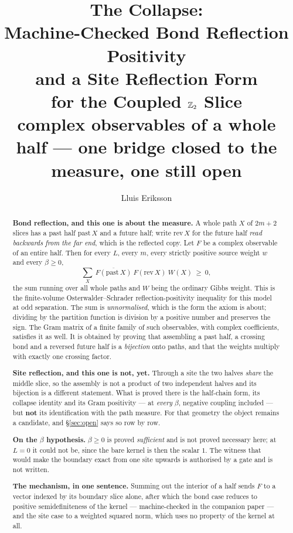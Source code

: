 \documentclass[11pt]{article}
\title{The Collapse:\\
Machine-Checked Bond Reflection Positivity\\
and a Site Reflection Form\\
for the Coupled $\mathbb{Z}_2$ Slice\\
\large complex observables of a whole half --- one bridge closed to the
measure, one still open}
\author{Lluis Eriksson}
\date{}
\theoremstyle{definition}
\begin{document}
\maketitle

\begin{abstract}
\textbf{Bond reflection, and this one is about the measure.}  A whole path $X$
of $2m+2$ slices has a past half $\mathrm{past}\,X$ and a future half; write
$\mathrm{rev}\,X$ for the future half \emph{read backwards from the far end},
which is the reflected copy.  Let $F$ be a complex observable of an entire half.
Then for every $L$, every $m$, every strictly positive source weight $w$ and
every $\beta\ge0$,
\[
  \sum_{X}\ \overline{F(\mathrm{past}\,X)}\ F(\mathrm{rev}\,X)\ W(X)\ \ge\ 0 ,
\]
the sum running over all whole paths and $W$ being the ordinary Gibbs weight.
This is the finite-volume Osterwalder--Schrader reflection-positivity inequality
for this model at odd separation.  The sum is \emph{unnormalised}, which is the
form the axiom is about; dividing by the partition function is division by a
positive number and preserves the sign.  The Gram matrix of a finite family of
such observables, with complex coefficients, satisfies it as well.  It is obtained by proving that
assembling a past half, a crossing bond and a reversed future half is a
\emph{bijection} onto paths, and that the weights multiply with exactly one
crossing factor.

\textbf{Site reflection, and this one is not, yet.}  Through a site the two
halves \emph{share} the middle slice, so the assembly is not a product of two
independent halves and its bijection is a different statement.  What is proved
there is the half-chain form, its collapse identity and its Gram positivity ---
at \emph{every} $\beta$, negative coupling included --- but \textbf{not} its
identification with the path measure.  For that geometry the object remains a
candidate, and \S\ref{sec:open} says so row by row.

\textbf{On the $\beta$ hypothesis.}  $\beta\ge0$ is proved \emph{sufficient} and
is not proved necessary here; at $L=0$ it could not be, since the bare kernel is
then the scalar $1$.  The witness that would make the boundary exact from one
site upwards is authorised by a gate and is not written.

\textbf{The mechanism, in one sentence.}  Summing out the interior of a half
sends $F$ to a vector indexed by its boundary slice alone, after which the bond
case reduces to positive semidefiniteness of the kernel --- machine-checked in
the companion paper \cite{ErikssonRefl} --- and the site case to a weighted
squared norm, which uses no property of the kernel at all.


\end{abstract}
\end{document}

